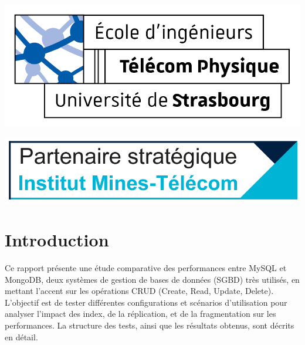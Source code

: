 \documentclass[12pt,a4paper]{report}
\begin{document}
\begin{titlepage}
    \begin{center}
        \begin{minipage}{0.45\textwidth}
            \includegraphics[width=\textwidth]{images/logo-tps.png}
        \end{minipage}
        \hfill
        \begin{minipage}{0.45\textwidth}
            \includegraphics[width=\textwidth]{images/logo_imt.png}
        \end{minipage}
    \end{center}
    
    \vspace{1.5cm} %

    
    \vfill %
    
\end{titlepage}

\thispagestyle{tocstyle}
\tableofcontents %
\clearpage %
\listoffigures
\clearpage

\pagestyle{plain} %


\chapter{Introduction}

\begin{card}
Ce rapport présente une étude comparative des performances entre MySQL et MongoDB, deux systèmes de gestion de bases de données (SGBD) très utilisés, en mettant l'accent sur les opérations CRUD (Create, Read, Update, Delete).\newline
L'objectif est de tester différentes configurations et scénarios d'utilisation pour analyser l'impact des index, de la réplication, et de la fragmentation sur les performances.\newline
La structure des tests, ainsi que les résultats obtenus, sont décrits en détail.
\end{card}
\end{document}
